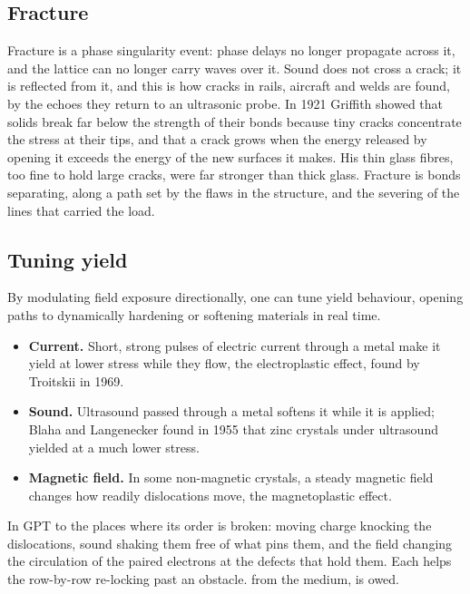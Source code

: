 \subsection{Fracture}

Fracture is a phase singularity event: phase delays no longer propagate across it, and the lattice can no longer carry waves over it.  Sound does not cross a crack; it is reflected from it, and this is how cracks in rails, aircraft and welds are found, by the echoes they return to an ultrasonic probe.  In 1921 Griffith showed that solids break far below the strength of their bonds because tiny cracks concentrate the stress at their tips, and that a crack grows when the energy released by opening it exceeds the energy of the new surfaces it makes. His thin glass fibres, too fine to hold large cracks, were far stronger than thick glass. Fracture is bonds separating, along a path set by the flaws in the structure, and the severing of the lines that carried the load.

\subsection{Tuning yield}

By modulating field exposure directionally, one can tune yield behaviour, opening paths to dynamically hardening or softening materials in real time. 
\begin{itemize}
\item \textbf{Current.} Short, strong pulses of electric current through a metal make it yield at lower stress while they flow, the electroplastic effect, found by Troitskii in 1969.
\item \textbf{Sound.} Ultrasound passed through a metal softens it while it is applied; Blaha and Langenecker found in 1955 that zinc crystals under ultrasound yielded at a much lower stress.
\item \textbf{Magnetic field.} In some non-magnetic crystals, a steady magnetic field changes how readily dislocations move, the magnetoplastic effect.
\end{itemize}
In GPT  to the places where its order is broken: moving charge knocking the dislocations, sound shaking them free of what pins them, and the field changing the circulation of the paired electrons at the defects that hold them. Each helps the row-by-row re-locking past an obstacle.  from the medium, is owed.

